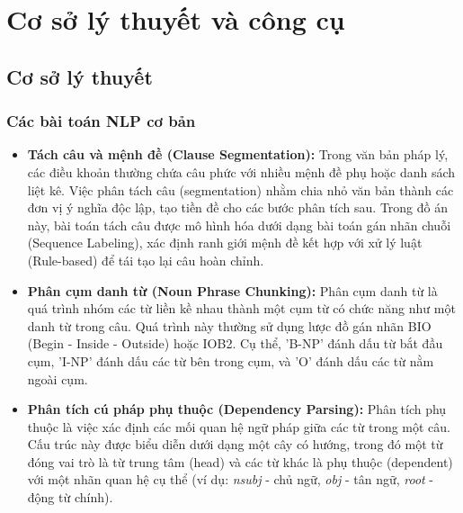 \section{Cơ sở lý thuyết và công cụ}

\subsection{Cơ sở lý thuyết}

\subsubsection{Các bài toán NLP cơ bản}
\begin{itemize}
\item \textbf{Tách câu và mệnh đề (Clause Segmentation):}
Trong văn bản pháp lý, các điều khoản thường chứa câu phức với nhiều mệnh đề phụ hoặc danh sách liệt kê. Việc phân tách câu (segmentation) nhằm chia nhỏ văn bản thành các đơn vị ý nghĩa độc lập, tạo tiền đề cho các bước phân tích sau. Trong đồ án này, bài toán tách câu được mô hình hóa dưới dạng bài toán gán nhãn chuỗi (Sequence Labeling), xác định ranh giới mệnh đề kết hợp với xử lý luật (Rule-based) để tái tạo lại câu hoàn chỉnh.
\item \textbf{Phân cụm danh từ (Noun Phrase Chunking):}
Phân cụm danh từ là quá trình nhóm các từ liền kề nhau thành một cụm từ có chức năng như một danh từ trong câu. Quá trình này thường sử dụng lược đồ gán nhãn BIO (Begin - Inside - Outside) hoặc IOB2. Cụ thể, 'B-NP' đánh dấu từ bắt đầu cụm, 'I-NP' đánh dấu các từ bên trong cụm, và 'O' đánh dấu các từ nằm ngoài cụm.
\item \textbf{Phân tích cú pháp phụ thuộc (Dependency Parsing):}
Phân tích phụ thuộc là việc xác định các mối quan hệ ngữ pháp giữa các từ trong một câu. Cấu trúc này được biểu diễn dưới dạng một cây có hướng, trong đó một từ đóng vai trò là từ trung tâm (head) và các từ khác là phụ thuộc (dependent) với một nhãn quan hệ cụ thể (ví dụ: \textit{nsubj} - chủ ngữ, \textit{obj} - tân ngữ, \textit{root} - động từ chính).
\end{itemize}

